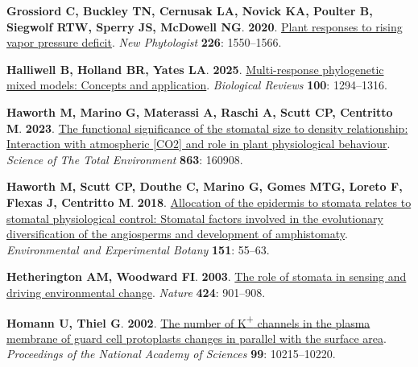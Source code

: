 \documentclass[
  letterpaper,
  DIV=11,
  numbers=noendperiod]{scrartcl}
\newlength{\cslhangindent}
\newenvironment{CSLReferences}[2] %
 {\begin{list}{}{%
  \setlength{\itemindent}{0pt}
  \setlength{\leftmargin}{0pt}
  \setlength{\parsep}{0pt}
  \ifodd #1
   \setlength{\leftmargin}{\cslhangindent}
   \setlength{\itemindent}{-1\cslhangindent}
  \fi
  \setlength{\itemsep}{#2\baselineskip}}}
 {\end{list}}
\begin{document}
\begin{CSLReferences}{0}{1}
\textbf{\textbf{Grossiord C}, \textbf{Buckley TN}, \textbf{Cernusak LA},
\textbf{Novick KA}, \textbf{Poulter B}, \textbf{Siegwolf RTW},
\textbf{Sperry JS}, \textbf{McDowell NG}}. \textbf{2020}.
\href{https://doi.org/10.1111/nph.16485}{Plant responses to rising vapor
pressure deficit}. \emph{New Phytologist} \textbf{226}: 1550--1566.

\textbf{\textbf{Halliwell B}, \textbf{Holland BR}, \textbf{Yates LA}}.
\textbf{2025}. \href{https://doi.org/10.1111/brv.70001}{Multi-response
phylogenetic mixed models: Concepts and application}. \emph{Biological
Reviews} \textbf{100}: 1294--1316.

\textbf{\textbf{Haworth M}, \textbf{Marino G}, \textbf{Materassi A},
\textbf{Raschi A}, \textbf{Scutt CP}, \textbf{Centritto M}}.
\textbf{2023}.
\href{https://doi.org/10.1016/j.scitotenv.2022.160908}{The functional
significance of the stomatal size to density relationship: {Interaction}
with atmospheric {[}{CO2}{]} and role in plant physiological behaviour}.
\emph{Science of The Total Environment} \textbf{863}: 160908.

\textbf{\textbf{Haworth M}, \textbf{Scutt CP}, \textbf{Douthe C},
\textbf{Marino G}, \textbf{Gomes MTG}, \textbf{Loreto F}, \textbf{Flexas
J}, \textbf{Centritto M}}. \textbf{2018}.
\href{https://doi.org/10.1016/j.envexpbot.2018.04.010}{Allocation of the
epidermis to stomata relates to stomatal physiological control:
{Stomatal} factors involved in the evolutionary diversification of the
angiosperms and development of amphistomaty}. \emph{Environmental and
Experimental Botany} \textbf{151}: 55--63.

\textbf{\textbf{Hetherington AM}, \textbf{Woodward FI}}. \textbf{2003}.
\href{https://doi.org/10.1038/nature01843}{The role of stomata in
sensing and driving environmental change}. \emph{Nature} \textbf{424}:
901--908.

\textbf{\textbf{Homann U}, \textbf{Thiel G}}. \textbf{2002}.
\href{https://doi.org/10.1073/pnas.152324399}{The number of
{K}{\textsuperscript{+}} channels in the plasma membrane of guard cell
protoplasts changes in parallel with the surface area}.
\emph{Proceedings of the National Academy of Sciences} \textbf{99}:
10215--10220.


\end{CSLReferences}
\end{document}
